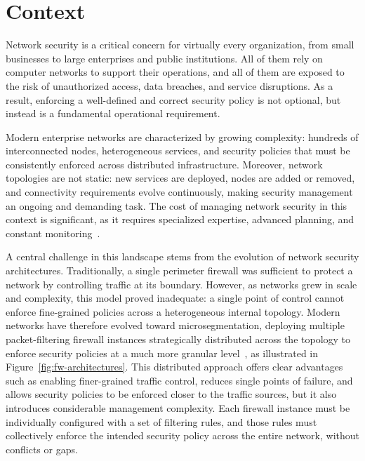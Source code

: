 
\section{Context}

Network security is a critical concern for virtually every organization, from small businesses to large enterprises and public institutions. All of them rely on computer networks to support their operations, and all of them are exposed to the risk of unauthorized access, data breaches, and service disruptions. As a result, enforcing a well-defined and correct security policy is not optional, but instead is a fundamental operational requirement.

Modern enterprise networks are characterized by growing complexity: hundreds of interconnected nodes, heterogeneous services, and security policies that must be consistently enforced across distributed infrastructure. Moreover, network topologies are not static: new services are deployed, nodes are added or removed, and connectivity requirements evolve continuously, making security management an ongoing and demanding task. The cost of managing network security in this context is significant, as it requires specialized expertise, advanced planning, and constant monitoring~\cite{automation-survey}.

A central challenge in this landscape stems from the evolution of network security architectures. Traditionally, a single perimeter firewall was sufficient to protect a network by controlling traffic at its boundary. However, as networks grew in scale and complexity, this model proved inadequate: a single point of control cannot enforce fine-grained policies across a heterogeneous internal topology. Modern networks have therefore evolved toward microsegmentation, deploying multiple packet-filtering firewall instances strategically distributed across the topology to enforce security policies at a much more granular level~\cite{novel-abstraction}, as illustrated in Figure~\ref{fig:fw-architectures}. This distributed approach offers clear advantages such as enabling finer-grained traffic control, reduces single points of failure, and allows security policies to be enforced closer to the traffic sources, but it also introduces considerable management complexity. Each firewall instance must be individually configured with a set of filtering rules, and those rules must collectively enforce the intended security policy across the entire network, without conflicts or gaps.

